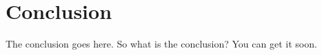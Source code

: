 \section{Conclusion}
The conclusion goes here. So what is the conclusion? You can get it soon. 
\cite{3gpp29060}